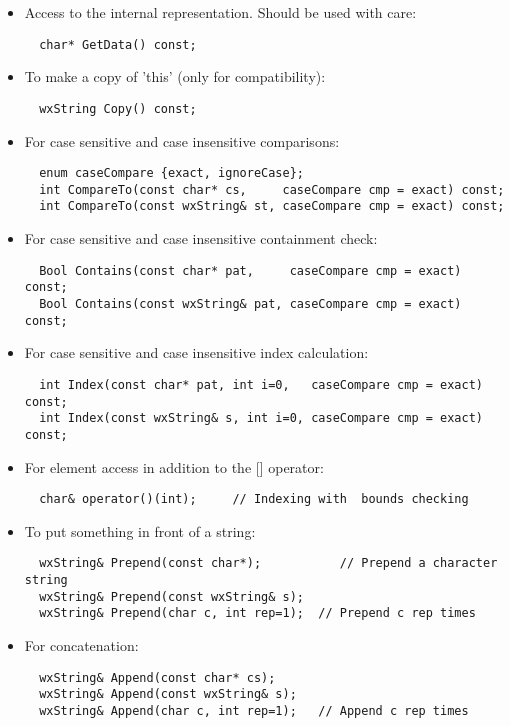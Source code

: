\begin{itemize}
\itemsep=0pt
\item Access to the internal representation. Should be used with care:
\begin{verbatim}
  char* GetData() const;
\end{verbatim}
\item To make a copy of 'this' (only for compatibility):
\begin{verbatim}
  wxString Copy() const;
\end{verbatim}
\item For case sensitive and case insensitive comparisons:
\begin{verbatim}
  enum caseCompare {exact, ignoreCase};
  int CompareTo(const char* cs,     caseCompare cmp = exact) const;
  int CompareTo(const wxString& st, caseCompare cmp = exact) const;
\end{verbatim}

\item For case sensitive and case insensitive containment check:
\begin{verbatim}
  Bool Contains(const char* pat,     caseCompare cmp = exact) const;
  Bool Contains(const wxString& pat, caseCompare cmp = exact) const;
\end{verbatim}

\item For case sensitive and case insensitive index calculation:
\begin{verbatim}
  int Index(const char* pat, int i=0,   caseCompare cmp = exact) const;
  int Index(const wxString& s, int i=0, caseCompare cmp = exact) const;
\end{verbatim}
  
\item For element access in addition to the [] operator:
\begin{verbatim}
  char& operator()(int);     // Indexing with  bounds checking
\end{verbatim}

\item To put something in front of a string:
\begin{verbatim}
  wxString& Prepend(const char*);           // Prepend a character string
  wxString& Prepend(const wxString& s);
  wxString& Prepend(char c, int rep=1);  // Prepend c rep times
\end{verbatim}

\item For concatenation:
\begin{verbatim}
  wxString& Append(const char* cs);
  wxString& Append(const wxString& s);
  wxString& Append(char c, int rep=1);   // Append c rep times
\end{verbatim}


\end{itemize}
